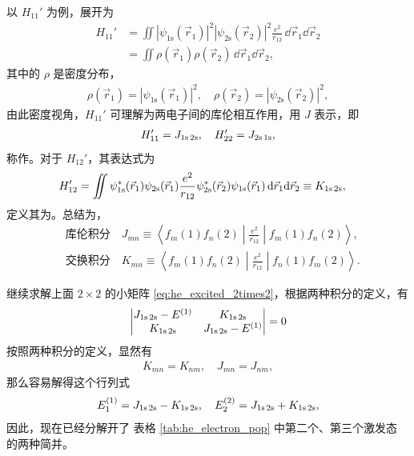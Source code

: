 以 $H_{11}'$ 为例，展开为
\begin{align}
    H_{11}' &= \iint |\psi_{\text{1s}}(\vec r_1)|^2 |\psi_{\text{2s}}(\vec r_2)|^2 \frac{e^2}{r_{12}} \,\dd\vec r_1 \dd\vec r_2 \\
    & = \iint \rho(\vec r_1) \rho(\vec r_2) \,\dd\vec r_1 \dd\vec r_2,
\end{align}
其中的 $\rho$ 是密度分布，
\begin{align}
    \rho(\vec r_1) = |\psi_{\text{1s}}(\vec r_1)|^2,
    \quad 
    \rho(\vec r_2) = |\psi_{\text{2s}}(\vec r_2)|^2,
\end{align}
由此密度视角，$H_{11}'$ 可理解为两电子间的库伦相互作用，用 $J$ 表示，即
\begin{align}
    H'_{11} = J_{\text{1s\,2s}}, \quad H_{22}' = J_{\text{2s\,1s}},
\end{align}
称作。对于 $H_{12}'$，其表达式为
\begin{align}
H_{12}' &= \iint \psi_{\text{1s}}^*(\vec r_1) \psi_{\text{2s}} (\vec r_1) \frac{e^2}{r_{12}} \psi_{\text{2s}}^*(\vec r_2) \psi_{\text{1s}} (\vec r_1) \,\mathrm{d}\vec r_1 \mathrm{d}\vec r_2 \equiv K_{\text{1s\,2s}},
\end{align}
定义其为。总结为，
\begin{align}
&\text{库伦积分}\quad 
J_{mn} \equiv \left\langle f_m(1) f_n(2) \middle| \frac{e^2}{r_{12}} \middle| f_m(1)f_n(2) \right\rangle, \\
&\text{交换积分}\quad K_{mn} \equiv \left\langle f_m(1) f_n(2) \middle| \frac{e^2}{r_{12}} \middle| f_n(1)f_m(2) \right\rangle. 
\end{align}

继续求解上面 $2\times2$ 的小矩阵 \eqref{eq:he_excited_2times2}，根据两种积分的定义，有
\begin{align}
    \left|\begin{matrix}
        J_{\text{1s\,2s}} - E^{(1)} & K_{\text{1s\,2s}} \\
        K_{\text{1s\,2s}} & J_{\text{1s\,2s}} - E^{(1)}
    \end{matrix}\right| = 0
\end{align}
按照两种积分的定义，显然有
\begin{align}
    K_{mn} = K_{nm}, \quad J_{mn} = J_{nm},
\end{align}
那么容易解得这个行列式
\begin{align}
E_1^{(1)} = J_{\text{1s\,2s}} - K_{\text{1s\,2s}}, \quad E_2^{(2)} = J_{\text{1s\,2s}} + K_{\text{1s\,2s}},
\end{align}
因此，现在已经分解开了
表格 \ref{tab:he_electron_pop} 中第二个、第三个激发态
的两种简并。

